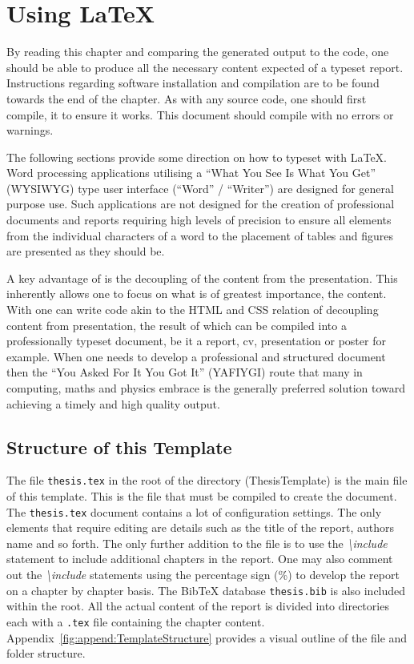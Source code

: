 \chapter{Using \LaTeX}\label{ch:usingLatex}

By reading this chapter and comparing the generated output to the \latex code, one should be able to produce all the necessary content expected of a typeset report. Instructions regarding software installation and compilation are to be found towards the end of the chapter. As with any source code, one should first compile, it to ensure it works. This document should compile with no errors or warnings. 

The following sections provide some direction on how to typeset with \LaTeX. Word processing applications utilising  a ``What You See Is What You Get'' (WYSIWYG) type user interface (``Word'' / ``Writer'') are designed for general purpose use. Such applications are not designed for the creation of professional documents and reports requiring high levels of precision to ensure all elements from the individual characters of a word to the placement of tables and figures are presented as they should be. 

A key advantage of \latex is the decoupling of the content from the presentation. This inherently allows one to focus on what is of greatest importance, the content. With \latex one can write code akin to the HTML and CSS relation of decoupling content from presentation, the result of which can be compiled into a professionally typeset document, be it a report, cv, presentation or poster for example. When one needs to develop a professional and structured document then the ``You Asked For It You Got It'' (YAFIYGI) route that many in computing, maths and physics embrace is the generally preferred solution toward achieving a timely and high quality output. 

\clearpage

\section{Structure of this Template}
The file {\tt thesis.tex} in the root of the directory (ThesisTemplate) is the main file of this template. This is the file that must be compiled to create the document. The {\tt thesis.tex} document contains a lot of configuration settings. The only elements that require editing are details such as the title of the report, authors name and so forth. The only further addition to the file is to use the \emph{\textbackslash include} statement to include additional chapters in the report. One may also comment out the \emph{\textbackslash include} statements using the percentage sign (\%) to develop the report on a chapter by chapter basis. The BibTeX database {\tt thesis.bib} is also included within the root. All the actual content of the report is divided into directories each with a {\tt .tex} file containing the chapter content. Appendix~\ref{fig:append:TemplateStructure} provides a visual outline of the file and folder structure.


